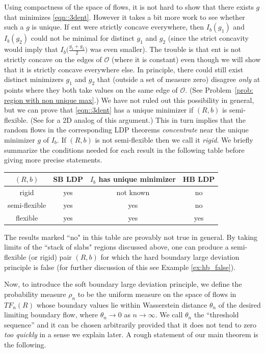 \documentclass[11pt]{article}
\theoremstyle{remark}
\theoremstyle{definition}
\newcommand{\ent}{\text{ent}}
\begin{document}
Using compactness of the space of flows, it is not hard to show that there exists $g$ that minimizes \eqref{eqn::3dent}. However it takes a bit more work to see whether such a $g$ is unique.  If $\ent$ were strictly concave everywhere, then $I_b(g_1)$ and $I_b(g_2)$ could not be minimal for distinct $g_1$ and $g_2$ (since the strict concavity would imply that $I_b\bigl(\frac{g_1+g_2}{2}\bigr)$ was even smaller). The trouble is that $\ent$ is not strictly concave on the edges of $\mathcal O$ (where it is constant) even though we will show that it is strictly concave everywhere else. In principle, there could still exist distinct minimizers $g_1$ and $g_2$ that (outside a set of measure zero) disagree {\em only} at points where they both take values on the same edge of $\mathcal O$. (See Problem~\ref{prob: region with non unique max}.) We have not ruled out this possibility in general, but we can prove that \eqref{eqn::3dent} has a unique minimizer if $(R,b)$ is semi-flexible. (See \cite[Proposition 7.10]{gorin2021lectures} for a 2D analog of this argument.) This in turn implies that the random flows in the corresponding LDP theorems {\em concentrate} near the unique minimizer $g$ of $I_b$. If $(R,b)$ is not semi-flexible then we call it \textit{rigid}. We briefly summarize the conditions needed for each result in the following table before giving more precise statements.
\begin{center} \begin{tabular}{|c|c|c|c|}
    \hline
     $(R,b)$ & SB LDP & $I_b$ has unique minimizer & HB LDP\\
\hline
rigid & {yes} & {not known} & {no} \\
\hline
semi-flexible & {yes} & {yes} & {no}\\
\hline
flexible & {yes} & {yes} & {yes}\\
\hline
\end{tabular}
\end{center}
The results marked ``no" in this table are provably not true in general. By taking limits of the ``stack of slabs" regions discussed above, one can produce a semi-flexible (or rigid) pair $(R,b)$ for which the hard boundary large deviation principle is false (for further discussion of this see Example \ref{ex:hb_false}). %

Now, to introduce the soft boundary large deviation principle, we define the probability measure $\rho_n$ to be the uniform measure on the space of flows in $TF_n(R)$ whose boundary values lie within Wasserstein distance $\theta_n$ of the desired limiting boundary flow, where $\theta_n\to 0$ as $n\to \infty$. We call $\theta_n$ the ``threshold sequence'' and it can be chosen arbitrarily provided that it does not tend to zero {\em too quickly} in a sense we explain later. A rough statement of our main theorem is the following.
\end{document}
